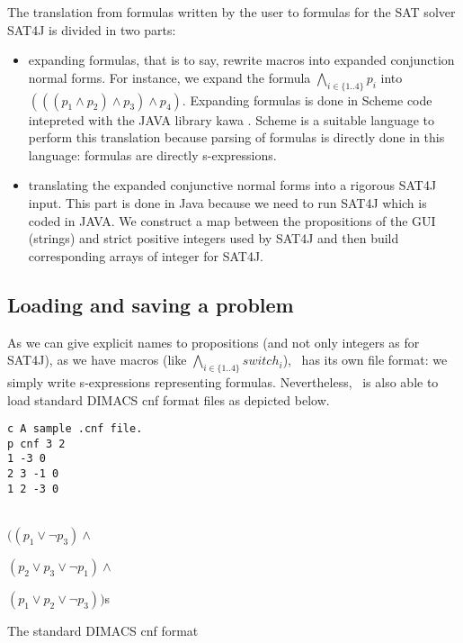 The translation from formulas written by the user to formulas for the SAT
solver SAT4J is divided in two parts:
\begin{itemize}
\item expanding formulas, that is to say, rewrite macros into expanded
  conjunction normal forms. For instance, we expand the formula $\bigwedge_{i
    \in \{1 .. 4\}} p_i$ into $(((p_1 \land p_2) \land p_3) \land
  p_4)$. Expanding formulas is done in Scheme code intepreted with the JAVA
  library kawa \cite{bothner1998kawa}. Scheme is a suitable language to
  perform this translation because parsing of formulas is directly done in
  this language: formulas are directly s-expressions.

\item translating the expanded conjunctive normal forms into a rigorous SAT4J
  input. This part is done in Java because we need to run SAT4J which is coded
  in JAVA. We construct a map between the propositions of the GUI (strings)
  and strict positive integers used by SAT4J and then build corresponding
  arrays of integer for SAT4J.
\end{itemize}



\subsection{Loading and saving a problem}

As we can give explicit names to propositions (and not only integers as for
SAT4J), as we have macros (like $\bigwedge_{i \in \{1 .. 4\}} switch_i$),
\satoulouse\ has its own file format: we simply write s-expressions representing
formulas. Nevertheless, \satoulouse\ is also able to load standard DIMACS cnf
format files as depicted below.\\[0pt]


\begin{minipage}{6cm}
\begin{center}
\begin{verbatim}
c A sample .cnf file. 
p cnf 3 2
1 -3 0
2 3 -1 0 
1 2 -3 0
\end{verbatim}
\end{center}
\end{minipage}
\begin{minipage}{6cm}
\mbox{  }\\[18pt]
$((p_1 \vee \neg p_3) \wedge$

$(p_2 \vee p_3 \vee \neg p_1) \wedge$

$ (p_1 \vee p_2 \vee \neg p_3))$s
\end{minipage}
\begin{center}The standard DIMACS cnf format\label{figure:dimacsformat}\end{center}

